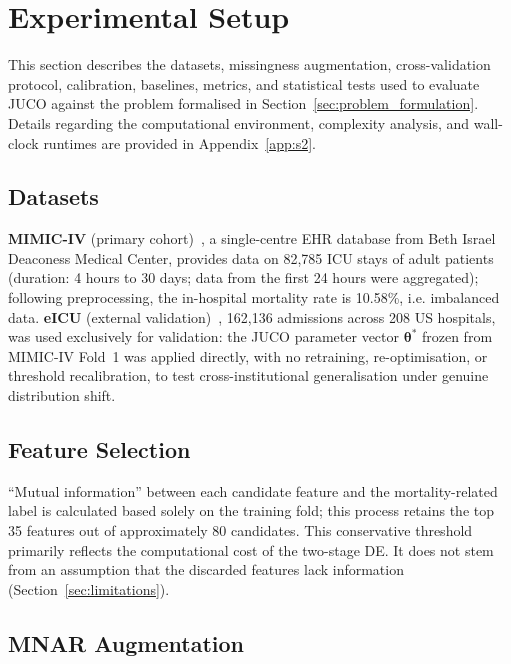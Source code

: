 \documentclass[journal]{IEEEtran}
\begin{document}
	\section{Experimental Setup}
	\label{sec:experimental_setup}
	
	This section describes the datasets, missingness augmentation, cross-validation protocol, calibration, baselines, metrics, and statistical tests used to evaluate JUCO against the problem formalised in Section~\ref{sec:problem_formulation}. Details regarding the computational environment, complexity analysis, and wall-clock runtimes are provided in Appendix~\ref{app:s2}.
	
	\subsection{Datasets}
	\label{sec:datasets}
	
	\textbf{MIMIC-IV} (primary cohort)~\cite{johnson2023mimic}, a single-centre EHR database from Beth Israel Deaconess Medical Center, provides data on 82,785 ICU stays of adult patients (duration: 4 hours to 30 days; data from the first 24 hours were aggregated); following preprocessing, the in-hospital mortality rate is 10.58\%, i.e. imbalanced data. \textbf{eICU} (external validation)~\cite{pollard2018eicu}, 162,136 admissions across 208 US hospitals, was used exclusively for validation: the JUCO parameter vector $\boldsymbol{\theta}^*$ frozen from MIMIC-IV Fold~1 was applied directly, with no retraining, re-optimisation, or threshold recalibration, to test cross-institutional generalisation under genuine distribution shift.
	
	\subsection{Feature Selection}
	\label{sec:feature_selection}
	
	``Mutual information'' between each candidate feature and the mortality-related label is calculated based solely on the training fold; this process retains the top 35 features out of approximately 80 candidates. This conservative threshold primarily reflects the computational cost of the two-stage DE. It does not stem from an assumption that the discarded features lack information (Section~\ref{sec:limitations}).
	
	\subsection{MNAR Augmentation}
	\label{sec:mnar_augmentation}
	
\end{document}
